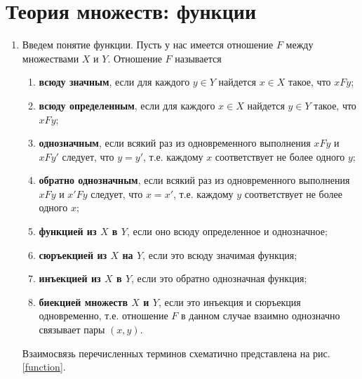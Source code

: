 

\section{Теория множеств: функции}\label{functions}


\begin{enumerate}
\item Введем понятие функции. Пусть у нас имеется отношение $F$ между множествами $X$ и $Y$. Отношение $F$ называется
\begin{enumerate}[{\bf Func1}]
\item \textbf{всюду значным}, если для каждого $y\in Y$ найдется $x\in X$ такое, что $xFy$;
\item \textbf{всюду определенным}, если для каждого $x\in X$ найдется $y\in Y$ такое, что $xFy$;
\item \textbf{однозначным}, если всякий раз из одновременного выполнения $xFy$ и $xFy'$ следует, что $y=y'$, т.е. каждому $x$ соответствует не более одного $y$;
\item \textbf{обратно однозначным}, если всякий раз из одновременного выполнения $xFy$ и $x'Fy$ следует, что $x=x'$, т.е. каждому $y$ соответствует не более одного $x$;
\item \textbf{функцией из $X$ в $Y$}, если оно всюду определенное и однозначное;

\item \textbf{сюръекцией из $X$ на $Y$}, если это всюду значимая функция;
\item \textbf{инъекцией из $X$ в $Y$}, если это обратно однозначная функция;
\item \textbf{биекцией множеств $X$ и $Y$}, если это инъекция и сюръекция одновременно, т.е. отношение $F$ в данном случае взаимно однозначно связывает пары $(x,y)$.
\end{enumerate}
Взаимосвязь перечисленных терминов схематично представлена на рис. \ref{function}.


\end{enumerate}
